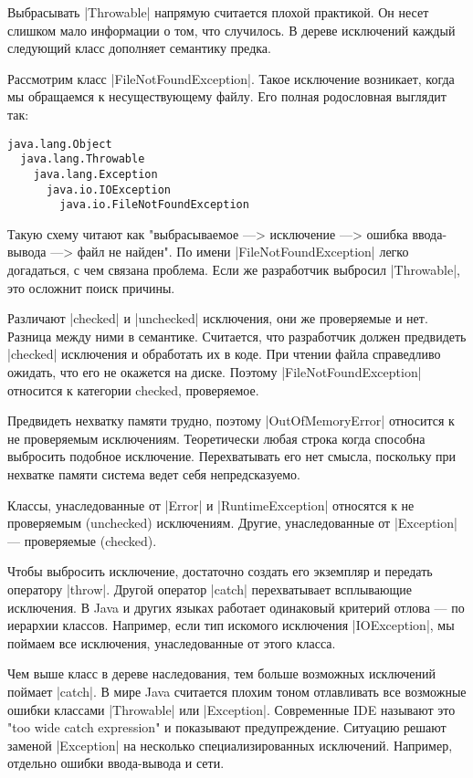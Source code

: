 Выбрасывать \spverb|Throwable| напрямую считается плохой практикой. Он несет слишком
мало информации о том, что случилось. В дереве исключений каждый следующий класс
дополняет семантику предка.

Рассмотрим класс \spverb|FileNotFoundException|. Такое исключение возникает, когда мы
обращаемся к несуществующему файлу. Его полная родословная выглядит так:

\begin{verbatim}
java.lang.Object
  java.lang.Throwable
    java.lang.Exception
      java.io.IOException
        java.io.FileNotFoundException
\end{verbatim}

Такую схему читают как "выбрасываемое —> исключение —> ошибка ввода-вывода —>
файл не найден". По имени \spverb|FileNotFoundException| легко догадаться, с чем
связана проблема. Если же разработчик выбросил \spverb|Throwable|, это осложнит поиск
причины.

Различают \spverb|checked| и \spverb|unchecked| исключения, они же проверяемые и нет. Разница
между ними в семантике. Считается, что разработчик должен предвидеть \spverb|checked|
исключения и обработать их в коде. При чтении файла справедливо ожидать, что его
не окажется на диске. Поэтому \spverb|FileNotFoundException| относится к категории
checked, проверяемое.

Предвидеть нехватку памяти трудно, поэтому \spverb|OutOfMemoryError| относится к не
проверяемым исключениям. Теоретически любая строка когда способна выбросить
подобное исключение. Перехватывать его нет смысла, поскольку при нехватке памяти
система ведет себя непредсказуемо.

Классы, унаследованные от \spverb|Error| и \spverb|RuntimeException| относятся к не проверяемым
(unchecked) исключениям. Другие, унаследованные от \spverb|Exception| — проверяемые
(checked).

Чтобы выбросить исключение, достаточно создать его экземпляр и передать
оператору \spverb|throw|. Другой оператор \spverb|catch| перехватывает всплывающие
исключения. В Java и других языках работает одинаковый критерий отлова — по
иерархии классов. Например, если тип искомого исключения \spverb|IOException|, мы
поймаем все исключения, унаследованные от этого класса.

Чем выше класс в дереве наследования, тем больше возможных исключений поймает
\spverb|catch|. В мире Java считается плохим тоном отлавливать все возможные ошибки
классами \spverb|Throwable| или \spverb|Exception|. Современные IDE называют это "too wide
catch expression" и показывают предупреждение. Ситуацию решают заменой
\spverb|Exception| на несколько специализированных исключений. Например, отдельно
ошибки ввода-вывода и сети.

